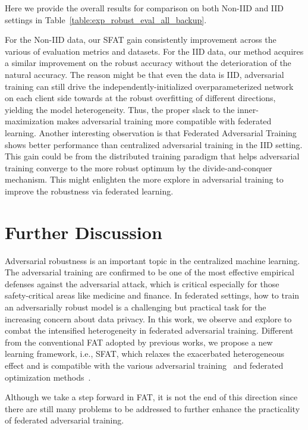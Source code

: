 \documentclass{article} %
\theoremstyle{plain}
\theoremstyle{definition}
\theoremstyle{remark}
\begin{document}
Here we provide the overall results for comparison on both Non-IID and IID settings in Table~\ref{table:exp_robust_eval_all_backup}.

For the Non-IID data, our SFAT gain consistently improvement across the various of evaluation metrics and datasets. For the IID data, our method acquires a similar improvement on the robust accuracy without the deterioration of the natural accuracy. The reason might be that even the data is IID, adversarial training can still drive the independently-initialized overparameterized network~\citep{allen2020towards} on each client side towards at the robust overfitting of different directions, yielding the model heterogeneity. Thus, the proper slack to the inner-maximization makes adversarial training more compatible with federated learning. Another interesting observation is that Federated Adversarial Training shows better performance than centralized adversarial training in the IID setting. This gain could be from the distributed training paradigm that helps adversarial training converge to the more robust optimum by the divide-and-conquer mechanism. This might enlighten the more explore in adversarial training to improve the robustness via federated learning.


\section{Further Discussion}
\label{app:impact}

Adversarial robustness is an important topic in the centralized machine learning. The adversarial training are confirmed to be one of the most effective empirical defenses against the adversarial attack, which is critical especially for those safety-critical areas like medicine and finance. In federated settings, how to train an adversarially robust model is a challenging but practical task for the increasing concern about data privacy. In this work, we observe and explore to combat the intensified heterogeneity in federated adversarial training. Different from the conventional FAT adopted by previous works, we propose a new learning framework, i.e., SFAT, which relaxes the exacerbated heterogeneous effect and is compatible with the various adversarial training~\citep{Madry_adversarial_training,Zhang_trades} and federated optimization methods~\citep{li2018federated,karimireddy2020scaffold}.  

Although we take a step forward in FAT, it is not the end of this direction since there are still many problems to be addressed to further enhance the practicality of federated adversarial training.
\end{document}
